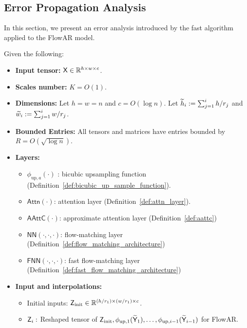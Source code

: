 \subsection{Error Propagation Analysis}\label{lem:error_propagation_analysis}
In this section, we present an error analysis introduced by the fast algorithm applied to the FlowAR model.
\begin{lemma}\label{lem:error_analysis_fast_flowar_informal}
    Given the following:
    \begin{itemize}
        \item {\bf Input tensor:} $\mathsf{X} \in \mathbb{R}^{h \times w \times c}$.
        \item {\bf Scales number:} $K = O(1)$.
        \item {\bf Dimensions:} Let $h=w=n$ and $c = O(\log n)$. Let $\widetilde{h}_i := \sum_{j=1}^i h/r_j$ and $\widetilde{w}_i := \sum_{j=1}^i w/r_j$.
        \item {\bf Bounded Entries:} All tensors and matrices have entries bounded by $R = O(\sqrt{\log n})$.
        \item {\bf Layers:}
        \begin{itemize}
            \item $\phi_{\mathrm{up},a}(\cdot)$ :  bicubic upsampling function (Definition~\ref{def:bicubic_up_sample_function}).
            \item $\mathsf{Attn}(\cdot)$: attention layer (Definition~\ref{def:attn_layer}).
            \item $\mathsf{AAttC(\cdot)}$: approximate attention layer (Definition~\ref{def:aattc})
            \item $\mathsf{NN}(\cdot,\cdot,\cdot)$: flow-matching layer (Definition~\ref{def:flow_matching_architecture})
            \item $\mathsf{FNN}(\cdot,\cdot,\cdot)$: fast flow-matching layer (Definition~\ref{def:fast_flow_matching_architecture})
        \end{itemize}
        \item {\bf Input and interpolations:}
        \begin{itemize}
            \item Initial inputs: $\mathsf{Z}_{\mathrm{init}} \in \mathbb{R}^{(h/r_1)\times(w/r_1) \times c}$.
            \item $\mathsf{Z}_i:$ Reshaped tensor of  $\mathsf{Z}_{\mathrm{init}}, \phi_{\mathrm{up},1}(\widetilde{\mathsf{Y}}_1), \dots, \phi_{\mathrm{up},i-1}(\widetilde{\mathsf{Y}}_{i-1})$ for FlowAR.

\end{itemize}
\end{itemize}
\end{lemma}

